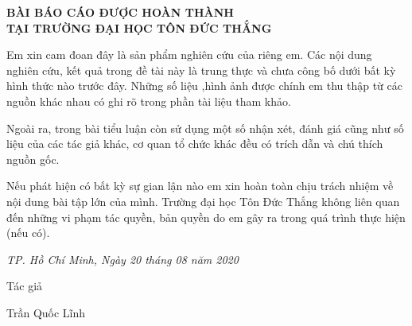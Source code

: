 \newpage	
\vspace{5cm} 
		
\begin{center}
{
\fontsize{16pt}{1}\selectfont
\textbf{BÀI BÁO CÁO ĐƯỢC HOÀN THÀNH \\
		TẠI TRƯỜNG ĐẠI HỌC TÔN ĐỨC THẮNG}
}
\end{center}

\bigskip
Em xin cam đoan đây là sản phẩm nghiên cứu của riêng em. Các nội dung nghiên cứu, kết quả trong đề tài này là trung thực và chưa công bố dưới bất kỳ hình thức nào trước đây. Những số liệu ,hình ảnh được chính em thu thập từ các nguồn khác nhau có ghi rõ trong phần tài liệu tham khảo.

Ngoài ra, trong bài tiểu luận còn sử dụng một số nhận xét, đánh giá cũng như số liệu của các tác giả khác, cơ quan tổ chức khác đều có trích dẫn và chú thích nguồn gốc.

Nếu phát hiện có bất kỳ sự gian lận nào em xin hoàn toàn chịu trách nhiệm về nội dung bài tập lớn của mình. Trường đại học Tôn Đức Thắng không liên quan đến những vi phạm tác quyền, bản quyền do em gây ra trong quá trình thực hiện (nếu có).

\begin{flushright}
{\it TP. Hồ Chí Minh, Ngày 20 tháng 08 năm 2020 }

Tác giả \hskip 2.5cm\quad

Trần Quốc Lĩnh \hskip 1.7cm\quad
 
\end{flushright}
\newpage

